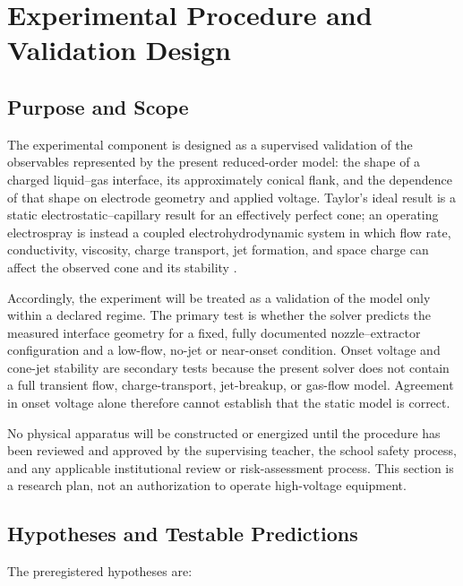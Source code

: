 \section{Experimental Procedure and Validation Design}\label{sec:experimental-procedure}

\subsection{Purpose and Scope}

The experimental component is designed as a supervised validation of the observables represented by the present reduced-order model: the shape of a charged liquid--gas interface, its approximately conical flank, and the dependence of that shape on electrode geometry and applied voltage. Taylor's ideal result is a static electrostatic--capillary result for an effectively perfect cone; an operating electrospray is instead a coupled electrohydrodynamic system in which flow rate, conductivity, viscosity, charge transport, jet formation, and space charge can affect the observed cone and its stability \cite{taylor1964disintegration,fernandez2007fluid,melcher1969electrohydrodynamics,saville1997electrohydrodynamics}.

Accordingly, the experiment will be treated as a validation of the model only within a declared regime. The primary test is whether the solver predicts the measured interface geometry for a fixed, fully documented nozzle--extractor configuration and a low-flow, no-jet or near-onset condition. Onset voltage and cone-jet stability are secondary tests because the present solver does not contain a full transient flow, charge-transport, jet-breakup, or gas-flow model. Agreement in onset voltage alone therefore cannot establish that the static model is correct.

No physical apparatus will be constructed or energized until the procedure has been reviewed and approved by the supervising teacher, the school safety process, and any applicable institutional review or risk-assessment process. This section is a research plan, not an authorization to operate high-voltage equipment.

\subsection{Hypotheses and Testable Predictions}

The preregistered hypotheses are:

